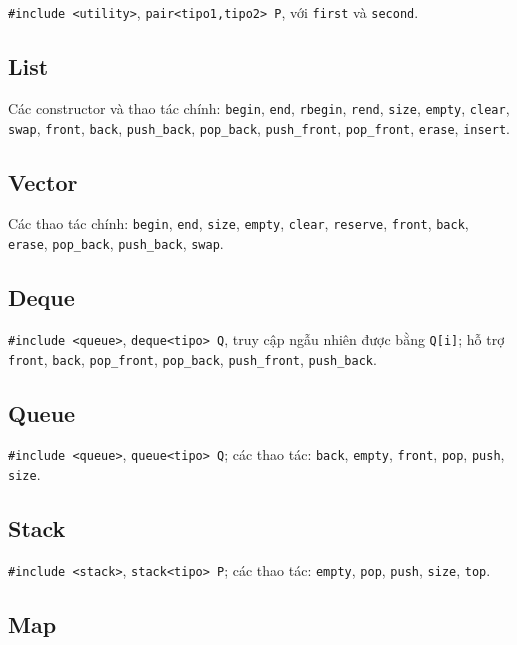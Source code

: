 \documentclass[11pt]{article}
\begin{document}
\texttt{\#include <utility>}, \texttt{pair<tipo1,tipo2> P}, với \texttt{first} và \texttt{second}.

\subsection{List}

Các constructor và thao tác chính: \texttt{begin}, \texttt{end}, \texttt{rbegin}, \texttt{rend}, \texttt{size}, \texttt{empty}, \texttt{clear}, \texttt{swap}, \texttt{front}, \texttt{back}, \texttt{push\_back}, \texttt{pop\_back}, \texttt{push\_front}, \texttt{pop\_front}, \texttt{erase}, \texttt{insert}.

\subsection{Vector}

Các thao tác chính: \texttt{begin}, \texttt{end}, \texttt{size}, \texttt{empty}, \texttt{clear}, \texttt{reserve}, \texttt{front}, \texttt{back}, \texttt{erase}, \texttt{pop\_back}, \texttt{push\_back}, \texttt{swap}.

\subsection{Deque}

\texttt{\#include <queue>}, \texttt{deque<tipo> Q}, truy cập ngẫu nhiên được bằng \texttt{Q[i]}; hỗ trợ \texttt{front}, \texttt{back}, \texttt{pop\_front}, \texttt{pop\_back}, \texttt{push\_front}, \texttt{push\_back}.

\subsection{Queue}

\texttt{\#include <queue>}, \texttt{queue<tipo> Q}; các thao tác: \texttt{back}, \texttt{empty}, \texttt{front}, \texttt{pop}, \texttt{push}, \texttt{size}.

\subsection{Stack}

\texttt{\#include <stack>}, \texttt{stack<tipo> P}; các thao tác: \texttt{empty}, \texttt{pop}, \texttt{push}, \texttt{size}, \texttt{top}.

\subsection{Map}
\end{document}
